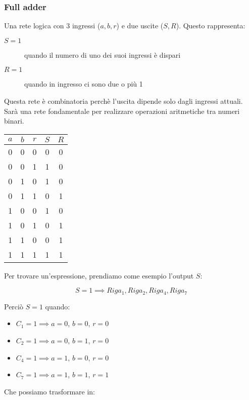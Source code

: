 \documentclass{subfiles}
\begin{document}
\subsubsection{Full adder}

Una rete logica con 3 ingressi ($a,b,r$) e due uscite ($S,R$). Questo rappresenta:

\begin{description}
	\item[$S = 1$] quando il numero di uno dei suoi ingressi è dispari
	\item[$R = 1$] quando in ingresso ci sono due o più 1
\end{description}

\noindent
Questa rete è combinatoria perchè l'uscita dipende solo dagli ingressi attuali.
Sarà una rete fondamentale per realizzare operazioni aritmetiche tra numeri binari.

\begin{center}
\begin{tabular}{ |c|c|c|c|c| }
\hline
$a$ & $b$ & $r$ & $S$ & $R$ \\
\hline
\hline
0 & 0 & 0 & 0 & 0 \\
0 & 0 & 1 & 1 & 0 \\
0 & 1 & 0 & 1 & 0 \\
0 & 1 & 1 & 0 & 1 \\
1 & 0 & 0 & 1 & 0 \\
1 & 0 & 1 & 0 & 1 \\
1 & 1 & 0 & 0 & 1 \\
1 & 1 & 1 & 1 & 1 \\
\hline
\end{tabular}
\end{center}

\noindent
Per trovare un'espressione, prendiamo come esempio l'output $S$:

$$
S = 1 \implies Riga_1, Riga_2, Riga_4, Riga_7
$$

\noindent
Perciò $S = 1$ quando:

\begin{itemize}
    \item $C_1 = 1 \implies a = 0$, $b = 0$, $r = 0$
    \item $C_2 = 1 \implies a = 0$, $b = 1$, $r = 0$
    \item $C_4 = 1 \implies a = 1$, $b = 0$, $r = 0$
    \item $C_7 = 1 \implies a = 1$, $b = 1$, $r = 1$
\end{itemize}

\noindent
Che possiamo trasformare in:
\end{document}
